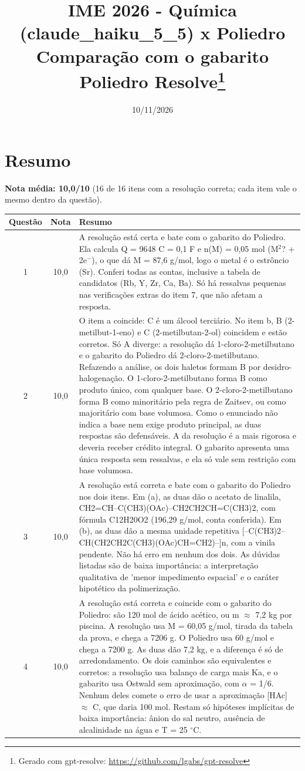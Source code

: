 \documentclass{article}%
\title{IME 2026 {-} Química (claude\_haiku\_5\_5) x Poliedro\\[4pt]\large Comparação com o gabarito Poliedro Resolve\thanks{Gerado com gpt-resolve: \url{https://github.com/lgabs/gpt-resolve}}}%
\date{10/11/2026}%
\begin{document}
%
\normalsize%
\maketitle%
\section*{Resumo}\textbf{Nota média: 10,0/10} (16 de 16 itens com a resolução correta; cada item vale o mesmo dentro da questão).\par\medskip%
\begin{longtable}{@{}c c p{}@{}}\toprule Questão & Nota & Resumo \\ \midrule
1 & 10,0 & A resolução está certa e bate com o gabarito do Poliedro. Ela calcula Q = 9648 C = 0,1 F e n(M) = 0,05 mol (M$^2$? + 2e$^{-}$), o que dá M = 87,6 g/mol, logo o metal é o estrôncio (Sr). Conferi todas as contas, inclusive a tabela de candidatos (Rb, Y, Zr, Ca, Ba). Só há ressalvas pequenas nas verificações extras do item 7, que não afetam a resposta. \\
2 & 10,0 & O item a coincide: C é um álcool terciário. No item b, B (2{-}metilbut{-}1{-}eno) e C (2{-}metilbutan{-}2{-}ol) coincidem e estão corretos. Só A diverge: a resolução dá 1{-}cloro{-}2{-}metilbutano e o gabarito do Poliedro dá 2{-}cloro{-}2{-}metilbutano. Refazendo a análise, os dois haletos formam B por desidro{-}halogenação. O 1{-}cloro{-}2{-}metilbutano forma B como produto único, com qualquer base. O 2{-}cloro{-}2{-}metilbutano forma B como minoritário pela regra de Zaitsev, ou como majoritário com base volumosa. Como o enunciado não indica a base nem exige produto principal, as duas respostas são defensáveis. A da resolução é a mais rigorosa e deveria receber crédito integral. O gabarito apresenta uma única resposta sem ressalvas, e ela só vale sem restrição com base volumosa. \\
3 & 10,0 & A resolução está correta e bate com o gabarito do Poliedro nos dois itens. Em (a), as duas dão o acetato de linalila, CH2=CH--C(CH3)(OAc)--CH2CH2CH=C(CH3)2, com fórmula C12H20O2 (196,29 g/mol, conta conferida). Em (b), as duas dão a mesma unidade repetitiva {[}--C(CH3)2--CH(CH2CH2C(CH3)(OAc)CH=CH2)--{]}n, com a vinila pendente. Não há erro em nenhum dos dois. As dúvidas listadas são de baixa importância: a interpretação qualitativa de 'menor impedimento espacial' e o caráter hipotético da polimerização. \\
4 & 10,0 & A resolução está correta e coincide com o gabarito do Poliedro: são 120 mol de ácido acético, ou m $\approx$ 7,2 kg por piscina. A resolução usa M = 60,05 g/mol, tirada da tabela da prova, e chega a 7206 g. O Poliedro usa 60 g/mol e chega a 7200 g. As duas dão 7,2 kg, e a diferença é só de arredondamento. Os dois caminhos são equivalentes e corretos: a resolução usa balanço de carga mais Ka, e o gabarito usa Ostwald sem aproximação, com $\alpha$ = 1/6. Nenhum deles comete o erro de usar a aproximação {[}HAc{]} $\approx$ C, que daria 100 mol. Restam só hipóteses implícitas de baixa importância: ânion do sal neutro, ausência de alcalinidade na água e T = 25 $^\circ$C. \\

\end{longtable}
\end{document}
